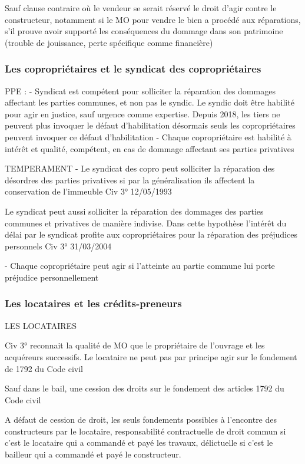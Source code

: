 		Sauf clause contraire où le vendeur se serait réservé le droit d’agir contre le constructeur, notamment si le MO pour vendre le bien a procédé aux réparations, s’il prouve avoir supporté les conséquences du dommage dans son patrimoine (trouble de jouissance, perte spécifique comme financière)


		\subsubsection{Les copropriétaires et le syndicat des copropriétaires}

		PPE :
		-	Syndicat est compétent pour solliciter la réparation des dommages affectant les parties communes, et non pas le syndic. Le syndic doit être habilité pour agir en justice, sauf urgence comme expertise. Depuis 2018, les tiers ne peuvent plus invoquer le défaut d’habilitation désormais seuls les copropriétaires peuvent invoquer ce défaut d’habilitation
		-	Chaque copropriétaire est habilité à intérêt et qualité, compétent, en cas de dommage affectant ses parties privatives

		TEMPERAMENT
		-	Le syndicat des copro peut solliciter la réparation des désordres des parties privatives si par la généralisation ils affectent la conservation de l’immeuble Civ 3° 12/05/1993

		Le syndicat peut aussi solliciter la réparation des dommages des parties communes et privatives de manière indivise. Dans cette hypothèse l’intérêt du délai par le syndicat profite aux copropriétaires pour la réparation des préjudices personnels Civ 3° 31/03/2004

		-	Chaque copropriétaire peut agir si l’atteinte au partie commune lui porte préjudice personnellement


		\subsubsection{Les locataires et les crédits-preneurs}

		LES LOCATAIRES

		Civ 3° reconnait la qualité de MO que le propriétaire de l’ouvrage et les acquéreurs successifs.
		Le locataire ne peut pas par principe agir sur le fondement de 1792 du Code civil

		Sauf dans le bail, une cession des droits sur le fondement des articles 1792 du Code civil

		A défaut de cession de droit, les seuls fondements possibles à l’encontre des constructeurs par le locataire, responsabilité contractuelle de droit commun si c’est le locataire qui a commandé et payé les travaux, délictuelle si c’est le bailleur qui a commandé et payé le constructeur.

